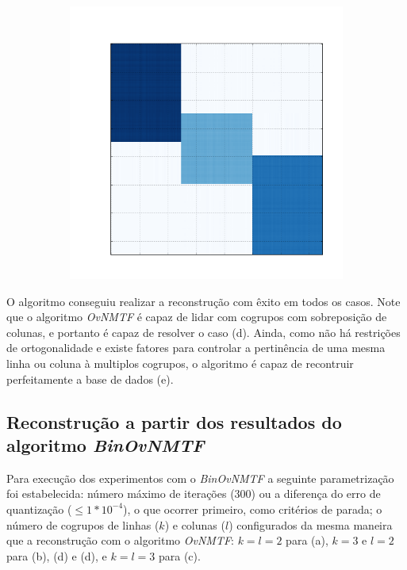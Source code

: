 \documentclass[
    12pt,                %
    oneside,            %
    a4paper,            %
    english,            %
    brazil                %
    ]{abntex2ppgsi}
\begin{document}
\begin{figure}[H]
\begin{subfigure}[b]{0.18\textwidth}
        \caption{}
    \end{subfigure}
    \begin{subfigure}[b]{0.18\textwidth}
        \includegraphics[width=\textwidth]{img/e-reconstruction-ovnmtf.png}
        \caption{}
    \end{subfigure}
    \label{fig:reconstruction:ovnmtf}
\end{figure}

O algoritmo conseguiu realizar a reconstrução com êxito em todos os casos.
Note que o algoritmo \textit{OvNMTF} é capaz de lidar com cogrupos com sobreposição de colunas, e portanto é capaz de resolver o caso (d).
Ainda, como não há restrições de ortogonalidade e existe fatores para controlar a pertinência de uma mesma linha ou coluna à multiplos cogrupos, o algoritmo é capaz de recontruir perfeitamente a base de dados (e).

\subsection{Reconstrução a partir dos resultados do algoritmo \textit{Bin\-OvNMTF}}
\label{subsec:results-reconstruction-binovnmtf}

Para execução dos experimentos com o \textit{BinOvNMTF} a seguinte parametrização foi estabelecida: número máximo de iterações ($300$) ou a diferença do erro de quantização ($\leq 1 * 10^{-4}$), o que ocorrer primeiro, como critérios de parada; o número de cogrupos de linhas ($k$) e colunas ($l$) configurados da mesma maneira que a reconstrução com o algoritmo \textit{OvNMTF}: $k = l = 2$ para (a), $k = 3$ e $l = 2$ para (b), (d) e (d), e $k = l = 3$ para (c).
\end{document}

